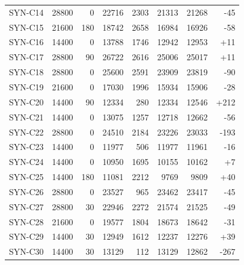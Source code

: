 \begin{longtable}{lrrrrrrr}
SYN-C14 & 28800 & 0 & 22716 & 2303 & 21313 & 21268 & -45\\
SYN-C15 & 21600 & 180 & 18742 & 2658 & 16984 & 16926 & -58\\
SYN-C16 & 14400 & 0 & 13788 & 1746 & 12942 & 12953 & +11\\
SYN-C17 & 28800 & 90 & 26722 & 2616 & 25006 & 25017 & +11\\
SYN-C18 & 28800 & 0 & 25600 & 2591 & 23909 & 23819 & -90\\
SYN-C19 & 21600 & 0 & 17030 & 1996 & 15934 & 15906 & -28\\
SYN-C20 & 14400 & 90 & 12334 & 280 & 12334 & 12546 & +212\\
SYN-C21 & 14400 & 0 & 13075 & 1257 & 12718 & 12662 & -56\\
SYN-C22 & 28800 & 0 & 24510 & 2184 & 23226 & 23033 & -193\\
SYN-C23 & 14400 & 0 & 11977 & 506 & 11977 & 11961 & -16\\
SYN-C24 & 14400 & 0 & 10950 & 1695 & 10155 & 10162 & +7\\
SYN-C25 & 14400 & 180 & 11081 & 2212 & 9769 & 9809 & +40\\
SYN-C26 & 28800 & 0 & 23527 & 965 & 23462 & 23417 & -45\\
SYN-C27 & 28800 & 30 & 22946 & 2272 & 21574 & 21525 & -49\\
SYN-C28 & 21600 & 0 & 19577 & 1804 & 18673 & 18642 & -31\\
SYN-C29 & 14400 & 30 & 12949 & 1612 & 12237 & 12276 & +39\\
SYN-C30 & 14400 & 30 & 13129 & 112 & 13129 & 12862 & -267\\
\end{longtable}
\endgroup

